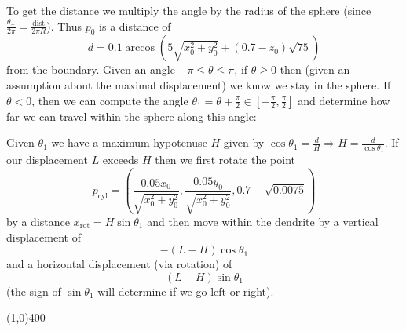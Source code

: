 \documentclass[a4paper,10pt]{article}
\begin{document}
To get the distance we multiply the angle by the radius of the sphere (since
\(\frac{\theta_+}{2 \pi} = \frac{\text{dist}}{2 \pi R}\)). Thus \(p_0\)
is a distance of
\[d = 0.1 \arccos\left(5 \sqrt{x_0^2 + y_0^2} + (0.7 - z_0)\sqrt{75}
\right)\]
from the boundary. Given an angle \(-\pi \leq \theta \leq \pi\), if \(\theta
\geq 0\) then (given an assumption about the maximal displacement) we know
we stay in the sphere. If \(\theta < 0\), then we can compute the angle
\(\theta_1 = \theta + \frac{\pi}{2} \in \left[-\frac{\pi}{2}, \frac{\pi}{2}
\right]\) and determine how far we can travel
within the sphere along this angle:
\begin{center}
\end{center}
Given \(\theta_1\) we have a maximum hypotenuse \(H\) given by
\(\cos \theta_1 = \frac{d}{H} \Rightarrow H = \frac{d}{\cos \theta_1}\).
If our displacement \(L\) exceeds \(H\) then we first rotate the point
\[p_{\text{cyl}} = \left(\frac{0.05 x_0}{\sqrt{x_0^2 + y_0^2}},
\frac{0.05 y_0}{\sqrt{x_0^2 + y_0^2}}, 0.7 - \sqrt{0.0075}\right)\]
by a distance \(x_{\text{rot}} = H \sin \theta_1\) and then move within
the dendrite by a vertical displacement of
\[\boxed{- (L - H) \cos \theta_1}\]
and a horizontal displacement (via rotation) of
\[\boxed{(L - H) \sin \theta_1}\]
(the sign of \(\sin \theta_1\) will determine if we go left or right).

\begin{center}
\line(1,0){400}
\end{center}
\end{document}
